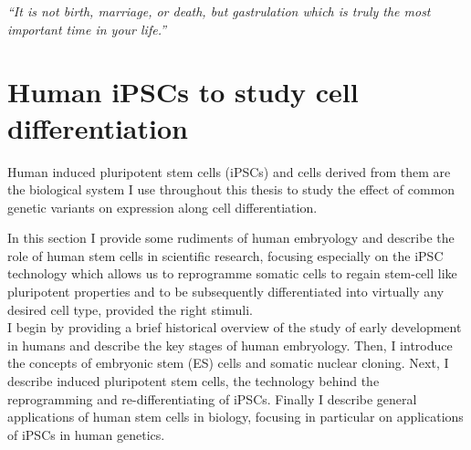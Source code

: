 

\newpage

\vspace*{10px}

\textit{“It is not birth, marriage, or death, but gastrulation which is truly the most important time in your life.”}\\

\vspace*{5px}

\section{Human iPSCs to study cell differentiation}  %

Human induced pluripotent stem cells (iPSCs) and cells derived from them are the biological system I use throughout this thesis to study the effect of common genetic variants on expression along cell differentiation.

In this section I provide some rudiments of human embryology and describe the role of human stem cells in scientific research, focusing especially on the iPSC technology which allows us to reprogramme somatic cells to regain stem-cell like pluripotent properties and to be subsequently differentiated into virtually any desired cell type, provided the right stimuli.\\

I begin by providing a brief historical overview of the study of early development in humans and describe the key stages of human embryology.
Then, I introduce the concepts of embryonic stem (ES) cells and somatic nuclear cloning.
Next, I describe induced pluripotent stem cells, the technology behind the reprogramming and re-differentiating of iPSCs.
Finally I describe general applications of human stem cells in biology, focusing in particular on applications of iPSCs in human genetics.

